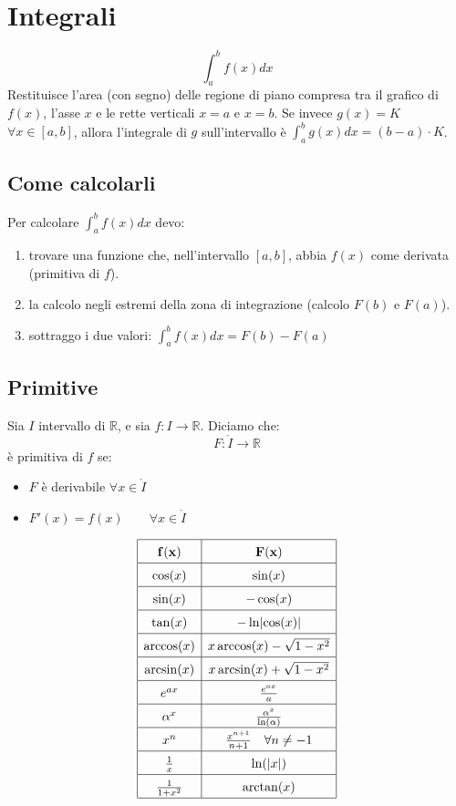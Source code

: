 \section{Integrali}
\begin{equation}
    \int_a^bf(x)dx
\end{equation}
Restituisce l'area (con segno) delle regione di piano compresa tra il grafico di $f(x)$, l'asse $x$ e le rette verticali $x=a$ e $x=b$.
Se invece $g(x) = K$ $\forall x\in[a, b]$, allora l'integrale di $g$ sull'intervallo è $\int_a^b g(x)dx = (b-a)\cdot K$.

\subsection{Come calcolarli}
Per calcolare $\int_a^bf(x)dx$ devo:
\begin{enumerate}
    \item trovare una funzione che, nell'intervallo $[a, b]$, abbia $f(x)$ come derivata (primitiva di $f$).
    \item la calcolo negli estremi della zona di integrazione (calcolo $F(b)$ e $F(a)$).
    \item sottraggo i due valori: $\int_a^bf(x)dx = F(b)-F(a)$
\end{enumerate}

\subsection{Primitive}
Sia $I$ intervallo di $\mathbb{R}$, e sia $f: I\to\mathbb{R}$. Diciamo che: $$F: \mathring{I}\to\mathbb{R}$$
è primitiva di $f$ se:
\begin{itemize}
    \item $F$ è derivabile $\forall x \in \mathring{I}$
    \item $F'(x)=f(x) \qquad\forall x \in \mathring{I}$
\end{itemize}
\[
\renewcommand{\arraystretch}{1.5} %
\begin{array}{|c|c|}
\hline
\mathbf{f(x)} & \mathbf{F(x)} \\ \hline
\cos(x) & \sin(x) \\ \hline
\sin(x) & -\cos(x) \\ \hline
\tan(x) & -\ln\lvert\cos(x)\lvert \\ \hline
\arccos(x) & x \arccos(x) - \sqrt{1 - x^2} \\ \hline
\arcsin(x) & x \arcsin(x) + \sqrt{1 - x^2} \\ \hline
e^{ax} & \frac{e^{ax}}{a} \\ \hline
\alpha^x & \frac{\alpha^x}{\ln(\alpha)} \\ \hline
x^n & \frac{x^{n+1}}{n+1} \quad \forall n \neq -1 \\ \hline
\frac{1}{x} & \ln(\lvert x \rvert) \\ \hline
\frac{1}{1+x^2} & \arctan(x) \\ \hline
\end{array}
\]


